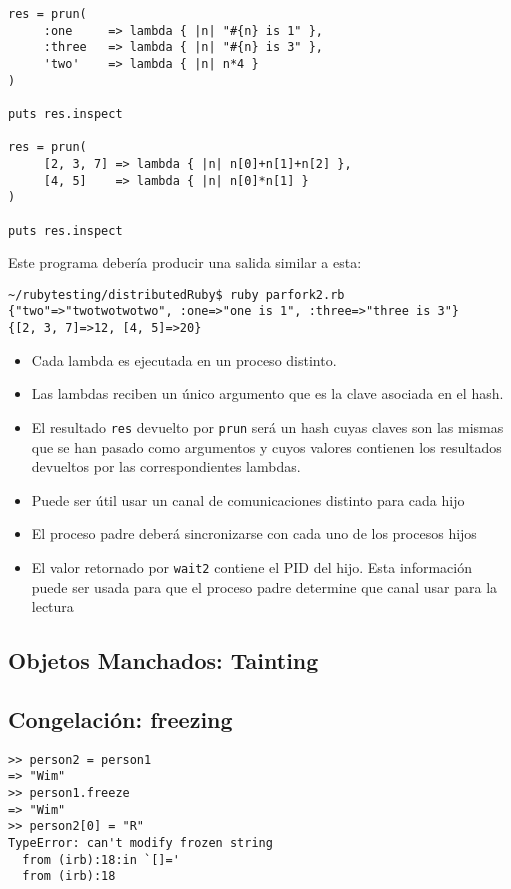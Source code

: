 \begin{verbatim}
res = prun(
     :one     => lambda { |n| "#{n} is 1" },
     :three   => lambda { |n| "#{n} is 3" },
     'two'    => lambda { |n| n*4 }
)

puts res.inspect

res = prun(
     [2, 3, 7] => lambda { |n| n[0]+n[1]+n[2] },
     [4, 5]    => lambda { |n| n[0]*n[1] }
)

puts res.inspect
\end{verbatim}
Este programa debería producir una salida similar a esta:
\begin{verbatim}
~/rubytesting/distributedRuby$ ruby parfork2.rb 
{"two"=>"twotwotwotwo", :one=>"one is 1", :three=>"three is 3"}
{[2, 3, 7]=>12, [4, 5]=>20}
\end{verbatim}
\begin{itemize}
\item
Cada lambda es ejecutada en un proceso distinto. 
\item 
Las lambdas reciben un único argumento que es la clave
asociada en el hash.
\item
El resultado \verb|res| devuelto por \verb|prun| será un hash cuyas claves son las mismas que se han pasado como argumentos
y cuyos valores contienen los resultados devueltos por las correspondientes lambdas.
\item
Puede ser útil usar un canal de comunicaciones distinto para cada hijo
\item
El proceso padre deberá sincronizarse con cada uno de los procesos hijos
\item
El valor retornado por \verb|wait2| contiene el PID del hijo. Esta información puede ser usada para 
que el proceso padre determine que canal usar para la lectura
\end{itemize}



\subsection{Objetos Manchados: Tainting}


\subsection{Congelación: freezing}
\label{subsection:freezing}

\begin{verbatim}
>> person2 = person1
=> "Wim"
>> person1.freeze
=> "Wim"
>> person2[0] = "R"
TypeError: can't modify frozen string
  from (irb):18:in `[]='
  from (irb):18
\end{verbatim}

